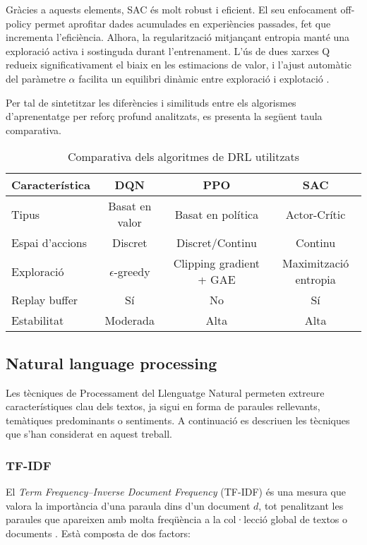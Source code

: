 \documentclass[12pt,a4paper,twoside]{book}
\begin{document}
Gràcies a aquests elements, SAC és molt robust i eficient. El seu enfocament off-policy permet aprofitar dades acumulades en experiències passades, fet que incrementa l’eficiència. Alhora, la regularització mitjançant entropia manté una exploració activa i sostinguda durant l'entrenament. L’ús de dues xarxes Q redueix significativament el biaix en les estimacions de valor, i l’ajust automàtic del paràmetre $\alpha$ facilita un equilibri dinàmic entre exploració i explotació \cite{Haarnoja2018}.

\vspace{2em}

Per tal de sintetitzar les diferències i similituds entre els algorismes d'aprenentatge per reforç profund analitzats, es presenta la següent taula comparativa.
\begin{table}[h]
\centering
\caption{Comparativa dels algoritmes de DRL utilitzats}
\begin{tabular}{lccc}
\hline
\textbf{Característica} & \textbf{DQN} & \textbf{PPO} & \textbf{SAC} \\ \hline
Tipus & Basat en valor & Basat en política & Actor-Crític \\
Espai d'accions & Discret & Discret/Continu & Continu \\
Exploració & $\epsilon$-greedy & Clipping gradient + GAE & Maximització entropia \\
Replay buffer & Sí & No & Sí \\
Estabilitat & Moderada & Alta & Alta \\ \hline
\end{tabular}
\label{tab:comparativa_algoritmes}
\end{table}



\subsection{Natural language processing}

 Les tècniques de Processament del Llenguatge Natural permeten extreure característiques clau dels textos, ja sigui en forma de paraules rellevants, temàtiques predominants o sentiments. A continuació es descriuen les tècniques que s'han considerat en aquest treball.

\subsubsection{TF-IDF}

El \emph{Term Frequency–Inverse Document Frequency} (TF-IDF) és una mesura que valora la importància d'una paraula dins d'un document $d$, tot penalitzant les paraules que apareixen amb molta freqüència a la col·lecció global de textos o documents \cite{Ramos2003}. Està composta de dos factors:
\end{document}

